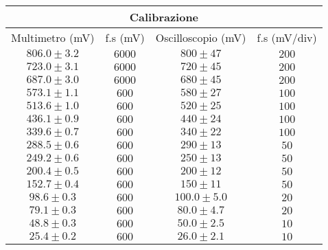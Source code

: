\documentclass[@MAIN@]{subfiles}
\begin{document}
    \begin{tabular}{ ||c|c|c|c|| }
        \hline
        \multicolumn{4}{||c||}{Calibrazione} \\
        \hline
        Multimetro (mV) & f.s (mV) & Oscilloscopio (mV) & f.s (mV/div) \\
        \hline
        $806.0\pm 3.2$  & $6000$   & $800\pm 47$        & $200$        \\
        \hline
        $723.0\pm 3.1$  & $6000$   & $720\pm 45$        & $200$        \\
        \hline
        $687.0\pm 3.0$  & $6000$   & $680\pm 45$        & $200$        \\
        \hline
        $573.1\pm 1.1$  & $600$    & $580\pm 27$        & $100$        \\
        \hline
        $513.6\pm 1.0$  & $600$    & $520\pm 25$        & $100$        \\
        \hline
        $436.1\pm 0.9$  & $600$    & $440\pm 24$        & $100$        \\
        \hline
        $339.6\pm 0.7$  & $600$    & $340\pm 22$        & $100$        \\
        \hline
        $288.5\pm 0.6$  & $600$    & $290\pm 13$        & $50$         \\
        \hline
        $249.2\pm 0.6$  & $600$    & $250\pm 13$        & $50$         \\
        \hline
        $200.4\pm 0.5$  & $600$    & $200\pm 12$        & $50$         \\
        \hline
        $152.7\pm 0.4$  & $600$    & $150\pm 11$        & $50$         \\
        \hline
        $98.6\pm 0.3$   & $600$    & $100.0\pm 5.0$     & $20$         \\
        \hline
        $79.1\pm 0.3$   & $600$    & $80.0\pm 4.7$      & $20$         \\
        \hline
        $48.8\pm 0.3$   & $600$    & $50.0\pm 2.5$      & $10$         \\
        \hline
        $25.4\pm 0.2$   & $600$    & $26.0\pm 2.1$      & $10$         \\
        \hline

    \end{tabular}
\end{document}
